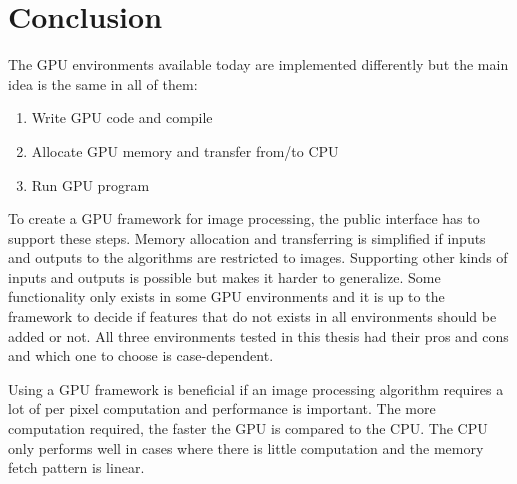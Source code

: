 \section{Conclusion}

The GPU environments available today are implemented differently but the main idea is the same in all of them:
\begin{enumerate}
\item Write GPU code and compile
\item Allocate GPU memory and transfer from/to CPU
\item Run GPU program
\end{enumerate}
To create a GPU framework for image processing, the public interface has to support these steps. Memory allocation and transferring is simplified if inputs and outputs to the algorithms are restricted to images. Supporting other kinds of inputs and outputs is possible but makes it harder to generalize. Some functionality only exists in some GPU environments and it is up to the framework to decide if features that do not exists in all environments should be added or not. All three environments tested in this thesis had their pros and cons and which one to choose is case-dependent.
\newline

Using a GPU framework is beneficial if an image processing algorithm requires a lot of per pixel computation and performance is important. The more computation required, the faster the GPU is compared to the CPU. The CPU only performs well in cases where there is little computation and the memory fetch pattern is linear.

